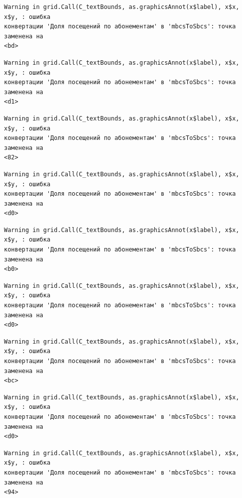 \documentclass[
  letterpaper,
  DIV=11,
  numbers=noendperiod]{scrreprt}
\begin{document}
\begin{verbatim}
Warning in grid.Call(C_textBounds, as.graphicsAnnot(x$label), x$x, x$y, : ошибка
конвертации 'Доля посещений по абонементам' в 'mbcsToSbcs': точка заменена на
<bd>
\end{verbatim}

\begin{verbatim}
Warning in grid.Call(C_textBounds, as.graphicsAnnot(x$label), x$x, x$y, : ошибка
конвертации 'Доля посещений по абонементам' в 'mbcsToSbcs': точка заменена на
<d1>
\end{verbatim}

\begin{verbatim}
Warning in grid.Call(C_textBounds, as.graphicsAnnot(x$label), x$x, x$y, : ошибка
конвертации 'Доля посещений по абонементам' в 'mbcsToSbcs': точка заменена на
<82>
\end{verbatim}

\begin{verbatim}
Warning in grid.Call(C_textBounds, as.graphicsAnnot(x$label), x$x, x$y, : ошибка
конвертации 'Доля посещений по абонементам' в 'mbcsToSbcs': точка заменена на
<d0>
\end{verbatim}

\begin{verbatim}
Warning in grid.Call(C_textBounds, as.graphicsAnnot(x$label), x$x, x$y, : ошибка
конвертации 'Доля посещений по абонементам' в 'mbcsToSbcs': точка заменена на
<b0>
\end{verbatim}

\begin{verbatim}
Warning in grid.Call(C_textBounds, as.graphicsAnnot(x$label), x$x, x$y, : ошибка
конвертации 'Доля посещений по абонементам' в 'mbcsToSbcs': точка заменена на
<d0>
\end{verbatim}

\begin{verbatim}
Warning in grid.Call(C_textBounds, as.graphicsAnnot(x$label), x$x, x$y, : ошибка
конвертации 'Доля посещений по абонементам' в 'mbcsToSbcs': точка заменена на
<bc>
\end{verbatim}

\begin{verbatim}
Warning in grid.Call(C_textBounds, as.graphicsAnnot(x$label), x$x, x$y, : ошибка
конвертации 'Доля посещений по абонементам' в 'mbcsToSbcs': точка заменена на
<d0>
\end{verbatim}

\begin{verbatim}
Warning in grid.Call(C_textBounds, as.graphicsAnnot(x$label), x$x, x$y, : ошибка
конвертации 'Доля посещений по абонементам' в 'mbcsToSbcs': точка заменена на
<94>
\end{verbatim}
\end{document}
